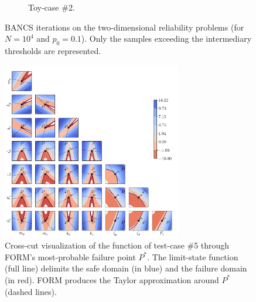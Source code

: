 \begin{figure}
\begin{subfigure}[b]{0.49\linewidth}
        \caption{Toy-case \#2.}
    \end{subfigure}
    \caption{BANCS iterations on the two-dimensional reliability problems (for $N=10^4$ and $p_0=0.1$). 
    Only the samples exceeding the intermediary thresholds are represented.}
    \label{fig:2D_toycase_reliability}
\end{figure}


\begin{figure}
    \centering
    \includegraphics[width=0.7\textwidth]{part3/figures/BANCS/crosscut_oscillator.png}
    \caption{Cross-cut visualization of the function of test-case \#5 through FORM's most-probable failure point $P^*$. 
    The limit-state function (full line) delimits the safe domain (in blue) and the failure domain (in red). 
    FORM produces the Taylor approximation around $P^*$ (dashed lines).}
    \label{fig:crosscut_oscillator}
\end{figure}


